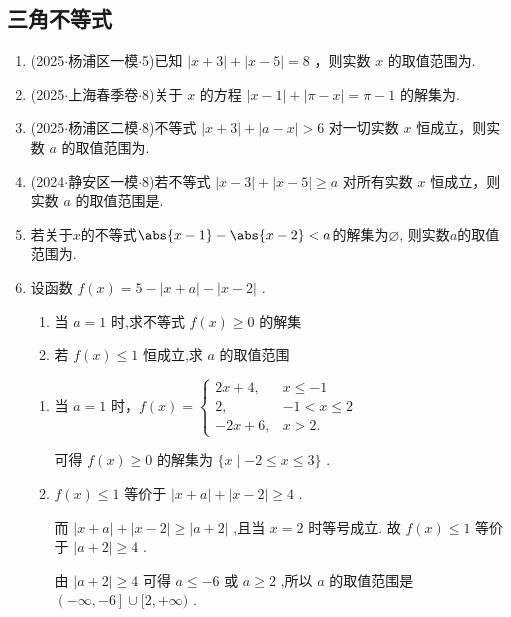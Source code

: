 \subsection*{三角不等式}
\begin{enumerate}
    \item (2025$\cdot$杨浦区一模$\cdot$5)已知 $\left| {x + 3}\right|  + \left| {x - 5}\right|  = 8$ ，则实数 $x$ 的取值范围为.
    \item (2025$\cdot$上海春季卷$\cdot$8)关于 $x$ 的方程 $\left| {x - 1}\right|  + \left| {\pi  - x}\right|  = \pi  - 1$ 的解集为.
    \item (2025$\cdot$杨浦区二模$\cdot$8)不等式 $\left| {x + 3}\right|  + \left| {a - x}\right|  > 6$ 对一切实数 $x$ 恒成立，则实数 $a$ 的取值范围为.
    \item (2024$\cdot$静安区一模$\cdot$8)若不等式 $\left| {x - 3}\right|  + \left| {x - 5}\right|  \geq  a$ 对所有实数 $x$ 恒成立，则实数 $a$ 的取值范围是\blkda[2]{$( - \infty ,2\rbrack$}.
    \item 若关于$x$的不等式$\abs{x-1}-\abs{x-2}<a$的解集为$\varnothing$, 则实数$a$的取值范围为. 
    \item 设函数 $f\left( x\right)  = 5 - \left| {x + a}\right|  - \left| {x - 2}\right|$ .
    \begin{enumerate}
        \item 当 $a = 1$ 时,求不等式 $f\left( x\right)  \geq  0$ 的解集
        \item 若 $f\left( x\right)  \leq  1$ 恒成立,求 $a$ 的取值范围
    \end{enumerate}
    \begin{jieda}
        \begin{enumerate}
            \item 当 $a = 1$ 时，$f\left( x\right)  = \left\{  \begin{array}{ll} 
            {2x} + 4, & x \leq   - 1 \\
            2, & - 1 < x \leq  2 \\
            - {2x} + 6, &x > 2. \end{array}\right.$
            
            可得 $f\left( x\right)  \geq  0$ 的解集为 $\{ x \mid   - 2 \leq  x \leq  3\}$ .
            \item $f\left( x\right)  \leq  1$ 等价于 $\left| {x + a}\right|  + \left| {x - 2}\right|  \geq  4$ .
            
            而 $\left| {x + a}\right|  + \left| {x - 2}\right|  \geq  \left| {a + 2}\right|$ ,且当 $x = 2$ 时等号成立. 故 $f\left( x\right)  \leq  1$ 等价于 $\left| {a + 2}\right|  \geq  4$ .
            
            由 $\left| {a + 2}\right|  \geq  4$ 可得 $a \leq   - 6$ 或 $a \geq  2$ ,所以 $a$ 的取值范围是 $\left( {-\infty , - 6}\right\rbrack   \cup  \lbrack 2, + \infty )$ .
        \end{enumerate}
    \end{jieda}
\end{enumerate}

